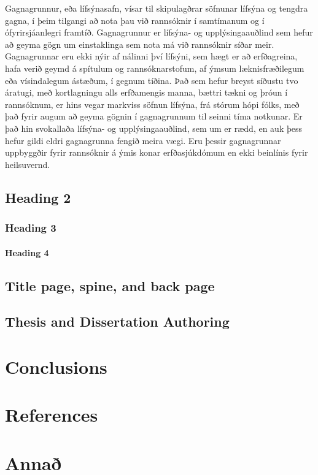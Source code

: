 \documentclass[a4paper,12pt,twoside,BCOR=10mm]{scrbook}
\begin{document}
Gagnagrunnur, eða lífsýnasafn, vísar til skipulagðrar söfnunar lífsýna og tengdra gagna, í þeim tilgangi að nota þau við rannsóknir í samtímanum og í ófyrirsjáanlegri framtíð. Gagnagrunnur er lífsýna- og upplýsingaauðlind sem hefur að geyma gögn um einstaklinga sem nota má við rannsóknir síðar meir.  Gagnagrunnar eru ekki nýir af nálinni því lífsýni, sem hægt er að erfðagreina, hafa verið geymd á spítulum og rannsóknarstofum, af ýmsum læknisfræðilegum eða vísindalegum ástæðum, í gegnum tíðina. Það sem hefur breyst síðustu tvo áratugi, með kortlagningu alls erfðamengis manna, bættri tækni og þróun í rannsóknum, er hins vegar markviss söfnun lífsýna, frá stórum hópi fólks, með það fyrir augum að geyma gögnin í gagnagrunnum til seinni tíma notkunar. Er það hin svokallaða lífsýna- og upplýsingaauðlind, sem um er rædd, en auk þess hefur gildi eldri gagnagrunna fengið meira vægi. Eru þessir gagnagrunnar uppbyggðir fyrir rannsóknir á ýmis konar erfðasjúkdómum en ekki beinlínis fyrir heilsuvernd.

\section{Heading 2}

\subsection{Heading 3}

\subsubsection{Heading 4}

\section{Title page, spine, and back page}

\section{Thesis and Dissertation Authoring}
 
\chapter{Conclusions}

\chapter{References}

\appendix
\renewcommand{\chaptername}{Appendix}
\chapter{Annað}

%
%
\end{document}
